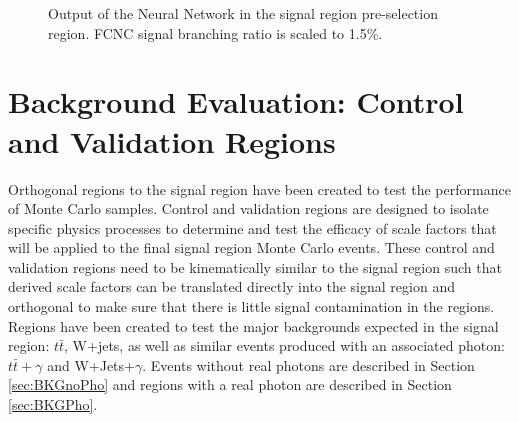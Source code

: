 \begin{figure}[h!]
\centering
{}\hfil
{}
\caption{Output of the Neural Network in the signal region pre-selection region.  FCNC signal branching ratio is scaled to 1.5\%.}
\label{fig:PreSelPlots5}
\end{figure}

\section{Background Evaluation: Control and Validation Regions}
\label{sec:BkgEvalCRVR}
Orthogonal regions to the signal region have been created to test the performance of Monte Carlo samples.  Control and validation regions are designed to isolate specific physics processes to determine and test the efficacy of scale factors that will be applied to the final signal region Monte Carlo events.  These control and validation regions need to be kinematically similar to the signal region such that derived scale factors can be translated directly into the signal region and orthogonal to make sure that there is little signal contamination in the regions.  Regions have been created to test the major backgrounds expected in the signal region: $t\bar{t}$, W+jets, as well as similar events produced with an associated photon: $t\bar{t}+\gamma$ and W+Jets+$\gamma$.  Events without real photons are described in Section \ref{sec:BKGnoPho} and regions with a real photon are described in Section \ref{sec:BKGPho}.

